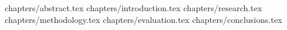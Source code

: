 \documentclass[a4paper,12pt]{article}
\begin{document}

\tableofcontents
\clearpage

{chapters/abstract.tex}
{chapters/introduction.tex}
{chapters/research.tex}
{chapters/methodology.tex}
{chapters/evaluation.tex}
{chapters/conclusions.tex}



\end{document}
